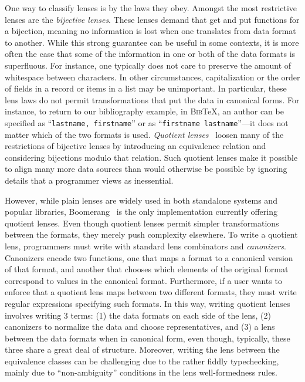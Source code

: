 \documentclass[acmsmall,review,anonymous]{acmart}\settopmatter{printfolios=true,printccs=false,printacmref=false}
\newcommand{\bibtex}{\textsc{Bib}\TeX{}}
\newcommand{\cd}[1]{\lstinline[backgroundcolor=\color{white}]$#1$}
\begin{document}
One way to classify lenses is by the laws they obey.  Amongst the most
restrictive lenses are the \emph{bijective lenses}.  These lenses demand
that get and put functions for a bijection, meaning no information
is lost when one translates from data format to another.  While this
strong guarantee can be useful in some contexts, it is more often the case
that some of the information in one or both of the data formats is superfluous.
For instance, one typically does not care to preserve the amount of
whitespace between characters.  In other circumstances, capitalization
or the order of fields in a record or items in a list may be unimportant.
%
In particular, these lens laws do not permit transformations that put the data
in canonical forms.
For instance, to return to our bibliography example, in \bibtex{},
an author can be specified as
``\cd{lastname, firstname}'' or as ``\cd{firstname lastname}''---it does not matter which of the
two formats is used.
{\em Quotient lenses}~\cite{quotientlenses} loosen many of the restrictions
of bijective lenses by introducing an equivalence relation and considering
bijections modulo that relation.  Such quotient lenses make it possible
to align many more data sources than would otherwise be possible by
ignoring details that a programmer views as inessential.

However, while plain lenses are widely used in both standalone systems and
popular libraries, Boomerang~\cite{boomerang} is the only implementation
currently offering quotient lenses. Even though quotient lenses permit simpler
transformations between the formats, they merely push complexity elsewhere. To
write a quotient lens, programmers must write with standard lens
combinators and \emph{canonizers}. Canonizers encode two functions, one that
maps a format to a canonical version of that format, and another that chooses
which elements of the original format correspond to values in the canonical
format. Furthermore, if a user wants to enforce that a quotient lens maps
between two different formats, they must write regular expressions specifying
such formats. In this way, writing quotient lenses involves writing 3 terms: (1)
the data formats on each side of the lens, (2) canonizers to normalize the data
and choose representatives, and (3) a lens between the data formats when in
canonical form, even though, typically, these three share a great deal of
structure. Moreover, writing the lens between the equivalence classes can be
challenging due to the rather fiddly typechecking, mainly due to
``non-ambiguity'' conditions in the lens well-formedness rules.
\end{document}
